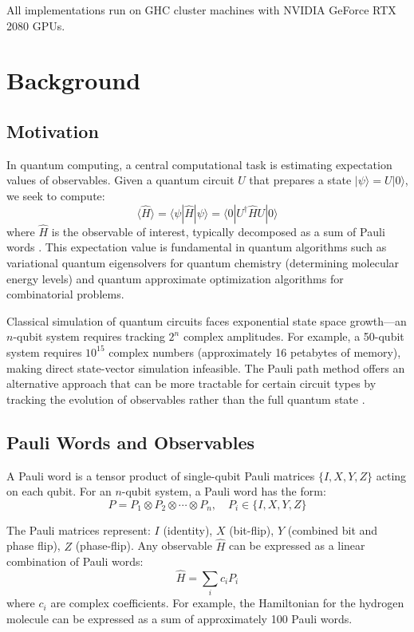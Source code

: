 \documentclass[11pt, a4paper]{article}
\begin{document}
\noindent  All implementations run on GHC cluster machines with NVIDIA GeForce RTX 2080 GPUs.

\section{Background}

\subsection{Motivation}

In quantum computing, a central computational task is estimating expectation values of observables. Given a quantum circuit $U$ that prepares a state $|\psi\rangle = U|0\rangle$, we seek to compute:
\begin{equation}
\langle \hat{H} \rangle = \langle\psi| \hat{H} |\psi\rangle = \langle 0| U^\dagger \hat{H} U |0\rangle
\end{equation}
where $\hat{H}$ is the observable of interest, typically decomposed as a sum of Pauli words \cite{ferreira2020}. This expectation value is fundamental in quantum algorithms such as variational quantum eigensolvers for quantum chemistry (determining molecular energy levels) and quantum approximate optimization algorithms for combinatorial problems.

Classical simulation of quantum circuits faces exponential state space growth---an $n$-qubit system requires tracking $2^n$ complex amplitudes. For example, a 50-qubit system requires $10^{15}$ complex numbers (approximately 16 petabytes of memory), making direct state-vector simulation infeasible. The Pauli path method offers an alternative approach that can be more tractable for certain circuit types by tracking the evolution of observables rather than the full quantum state \cite{gharibyan2025}.

\subsection{Pauli Words and Observables}

A Pauli word is a tensor product of single-qubit Pauli matrices $\{I, X, Y, Z\}$ acting on each qubit. For an $n$-qubit system, a Pauli word has the form:
\begin{equation}
P = P_1 \otimes P_2 \otimes \cdots \otimes P_n, \quad P_i \in \{I, X, Y, Z\}
\end{equation}

\noindent The Pauli matrices represent: $I$ (identity), $X$ (bit-flip), $Y$ (combined bit and phase flip), $Z$ (phase-flip). Any observable $\hat{H}$ can be expressed as a linear combination of Pauli words:
\begin{equation}
\hat{H} = \sum_i c_i P_i
\end{equation}
where $c_i$ are complex coefficients. For example, the Hamiltonian for the hydrogen molecule can be expressed as a sum of approximately 100 Pauli words.
\end{document}
